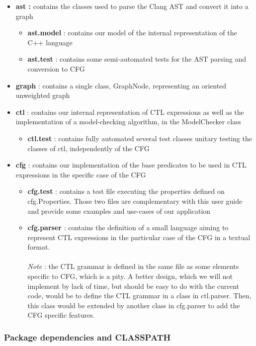 \documentclass{report}
\begin{document}
\begin{itemize} 
\item \textbf{ast : } contains the classes used to parse the Clang AST and convert it into a graph
	\begin{itemize} 
		\item \textbf{ast.model} : contains our model of the internal representation of the C++ language
		\item \textbf{ast.test} : contains some semi-automated tests for the AST parsing and conversion to CFG
	\end{itemize}
\item \textbf{graph} : contains a single class, GraphNode, representing an oriented unweighted graph
\item \textbf{ctl} : contains our internal representation of CTL expressions as well as the implementation of a model-checking algorithm, in the ModelChecker class
\begin{itemize} 
		\item \textbf{ctl.test} : contains fully automated several test classes unitary testing the classes of ctl, independently of the CFG
	\end{itemize}
\item \textbf{cfg} : contains our implementation of the base predicates to be used in CTL expressions in the specific case of the CFG
	\begin{itemize} 
		\item \textbf{cfg.test} : contains a test file executing the properties defined on cfg.Properties. Those two files are complementary with this user guide and provide some examples and use-cases of our application
		\item \textbf{cfg.parser} : contains the definition of a small language aiming to represent CTL expressions
		in the particular case of the CFG in a textual format. ~\\~\\
            \textit{Note} : the CTL grammar is defined in the same file as some elements specific to CFG, which is a pity.
		A better design, which we will not implement by lack of time, but should be easy to do with the current code, would be to define the CTL grammar in a class in ctl.parser.
		Then, this class would be extended by another class in cfg.parser to add the CFG specific features.
	\end{itemize}
\end{itemize}
\subsubsection{Package dependencies and CLASSPATH}
\end{document}

